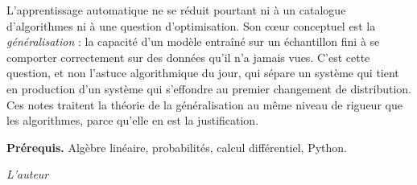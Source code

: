 \documentclass[12pt,a4paper,twoside]{book}
\theoremstyle{definition}
\theoremstyle{plain}
\theoremstyle{remark}
\begin{document}
\medskip

L'apprentissage automatique ne se r\'eduit pourtant ni \`a un catalogue d'algorithmes ni \`a une question d'optimisation. Son c\oe ur conceptuel est la \emph{g\'en\'eralisation} : la capacit\'e d'un mod\`ele entra\^in\'e sur un \'echantillon fini \`a se comporter correctement sur des donn\'ees qu'il n'a jamais vues. C'est cette question, et non l'astuce algorithmique du jour, qui s\'epare un syst\`eme qui tient en production d'un syst\`eme qui s'effondre au premier changement de distribution. Ces notes traitent la th\'eorie de la g\'en\'eralisation au m\^eme niveau de rigueur que les algorithmes, parce qu'elle en est la justification.

\medskip

\noindent\textbf{Pr\'erequis.} Alg\`ebre lin\'eaire, probabilit\'es, calcul diff\'erentiel, Python.

\vfill
\hfill\textit{L'auteur}


\mainmatter















\end{document}
